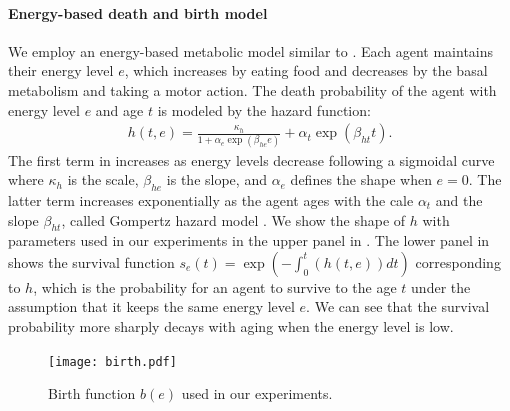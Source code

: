 \paragraph{Energy-based death and birth model}
We employ an energy-based metabolic model similar to \citet{hamonEcoevolutionaryDynamicsNonepisodic2023}. Each agent maintains their energy level $e$, which increases by eating food and decreases by the basal metabolism and taking a motor action.
The death probability of the agent with energy level $e$ and age $t$ is modeled by the hazard function:
\begin{align}
  h(t, e) = \frac{\kappa_{h}}{1 + \alpha_{e}\exp(\beta_{he}e)} + \alpha_{t} \exp(\beta_{ht} t).
  \label{eq:h}
\end{align}
The first term in  increases as energy levels decrease following a sigmoidal curve where $\kappa_{h}$ is the scale, $\beta_{he}$ is the slope, and $\alpha_{e}$ defines the shape when $e=0$. The latter term increases exponentially as the agent ages with the cale $\alpha_{t}$ and the slope $\beta_{ht}$, called Gompertz hazard model \citep{gompertzXXIVNatureFunction1825,kirkwoodDecipheringDeathCommentary2015}.
We show the shape of $h$ with parameters used in our experiments in the upper panel in . The lower panel in  shows the survival function $s_{e}(t) = \exp (-\int_{0}^{t}(h(t, e)) dt)$ corresponding to $h$, which is the probability for an agent to survive to the age $t$ under the assumption that it keeps the same energy level $e$. We can see that the survival probability more sharply decays with aging when the energy level is low.

\begin{figure}[t]
  \centering{}
  \texttt{[image: birth.pdf]}
  \caption{Birth function $b(e)$ used in our experiments.}\label{figure:birth}
\end{figure}

